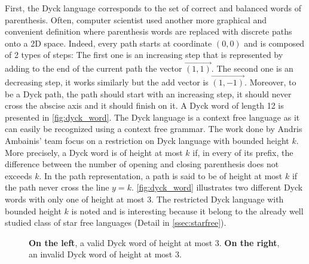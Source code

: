 First, the Dyck language corresponds to the set of correct and balanced words of parenthesis.
Often, computer scientist used another more graphical and convenient definition where
parenthesis words are replaced with discrete paths onto a 2D space. Indeed, every path starts
at coordinate $(0, 0)$ and is composed of 2 types of steps: The first one is an increasing step
that is represented  by adding to the end of the current path the vector $\overrightarrow{ (1,1)}$.
The second one is an decreasing step, it works similarly but the add vector is $\overrightarrow{ (1,-1)}$.
Moreover, to be a Dyck path, the path should start with an increasing step, it should never cross
the abscise axis and it should finish on it. A Dyck word of length 12 is presented in \autoref{fig:dyck_word}.
The Dyck language is a context free language as it can easily be recognized using a context
free grammar. The work done by Andris Ambainis' team \cite{art:2DGrid} focus on a restriction
on Dyck language with bounded height $k$. More precisely, a Dyck word is of height at most $k$ if, in every
of its prefix, the difference between the number of opening and closing parenthesis does not
exceeds $k$. In the path representation, a path is said to be of height at most $k$ if the path
never cross the line $y = k$. \autoref{fig:dyck_word} illustrates two different Dyck words with
only one of height at most 3. The restricted Dyck language with bounded height $k$ is noted 
and is interesting because it belong to the already well studied class of star
free languages (Detail in \autoref{ssec:starfree}).

\begin{figure}[h!]
    \centering
    \caption{\textbf{On the left}, a valid Dyck word of height at most 3. \textbf{On the right}, an invalid Dyck word of height at most 3.}
    \label{fig:dyck_word}
\end{figure}

